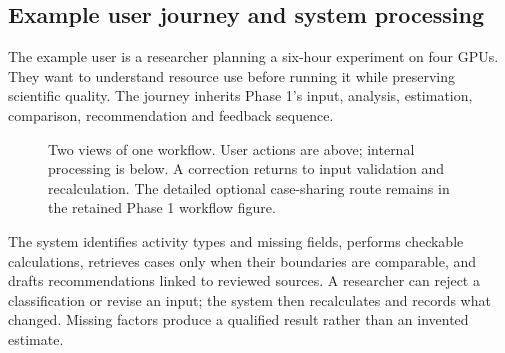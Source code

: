 \documentclass[11pt,a4paper]{article}
\begin{document}
\subsection{Example user journey and system processing}
The example user is a researcher planning a six-hour experiment on four GPUs. They want to understand resource use before running it while preserving scientific quality. The journey inherits Phase 1's input, analysis, estimation, comparison, recommendation and feedback sequence.
\begin{figure}[H]
\centering
{}
\caption{Two views of one workflow. User actions are above; internal processing is below. A correction returns to input validation and recalculation. The detailed optional case-sharing route remains in the retained Phase 1 workflow figure.}
\label{fig:phase2-two-lanes}
\end{figure}
The system identifies activity types and missing fields, performs checkable calculations, retrieves cases only when their boundaries are comparable, and drafts recommendations linked to reviewed sources. A researcher can reject a classification or revise an input; the system then recalculates and records what changed. Missing factors produce a qualified result rather than an invented estimate.
\end{document}

